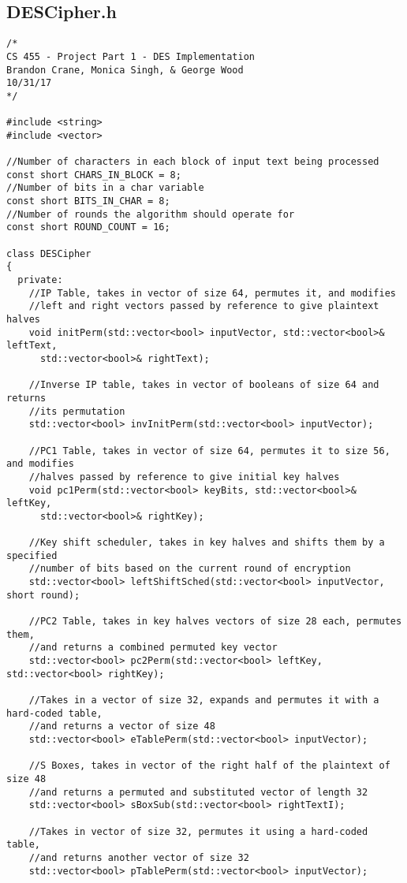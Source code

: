 \documentclass[11pt]{article}
\begin{document}
\subsection{DESCipher.h}
\begin{verbatim}
/*
CS 455 - Project Part 1 - DES Implementation
Brandon Crane, Monica Singh, & George Wood
10/31/17
*/

#include <string>
#include <vector>

//Number of characters in each block of input text being processed
const short CHARS_IN_BLOCK = 8;
//Number of bits in a char variable
const short BITS_IN_CHAR = 8;
//Number of rounds the algorithm should operate for
const short ROUND_COUNT = 16;

class DESCipher
{
  private:
    //IP Table, takes in vector of size 64, permutes it, and modifies
    //left and right vectors passed by reference to give plaintext halves
    void initPerm(std::vector<bool> inputVector, std::vector<bool>& leftText,
      std::vector<bool>& rightText);

    //Inverse IP table, takes in vector of booleans of size 64 and returns
    //its permutation
    std::vector<bool> invInitPerm(std::vector<bool> inputVector);

    //PC1 Table, takes in vector of size 64, permutes it to size 56, and modifies
    //halves passed by reference to give initial key halves
    void pc1Perm(std::vector<bool> keyBits, std::vector<bool>& leftKey,
      std::vector<bool>& rightKey);

    //Key shift scheduler, takes in key halves and shifts them by a specified
    //number of bits based on the current round of encryption
    std::vector<bool> leftShiftSched(std::vector<bool> inputVector, short round);

    //PC2 Table, takes in key halves vectors of size 28 each, permutes them,
    //and returns a combined permuted key vector
    std::vector<bool> pc2Perm(std::vector<bool> leftKey, std::vector<bool> rightKey);

    //Takes in a vector of size 32, expands and permutes it with a hard-coded table,
    //and returns a vector of size 48
    std::vector<bool> eTablePerm(std::vector<bool> inputVector);

    //S Boxes, takes in vector of the right half of the plaintext of size 48
    //and returns a permuted and substituted vector of length 32
    std::vector<bool> sBoxSub(std::vector<bool> rightTextI);

    //Takes in vector of size 32, permutes it using a hard-coded table,
    //and returns another vector of size 32
    std::vector<bool> pTablePerm(std::vector<bool> inputVector);


\end{verbatim}
\end{document}
